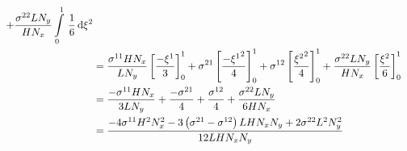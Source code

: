 \begin{equation}
\begin{aligned}
    +\dfrac{\conductivitytensorsymbol^{22} L N_{y}}{H N_{x}}\gint{0}{1}{\dfrac{1}{6}}{\xitwo} \\
    &=\dfrac{\conductivitytensorsymbol^{11} H N_{x}}{L N_{y}}\sqbrac{\dfrac{-\xione}{3}}^{1}_{0}
    +\conductivitytensorsymbol^{21}\sqbrac{\dfrac{-\xionesq}{4}}^{1}_{0}
    +\conductivitytensorsymbol^{12}\sqbrac{\dfrac{\xitwosq}{4}}^{1}_{0}
    +\dfrac{\conductivitytensorsymbol^{22} L N_{y}}{H N_{x}}\sqbrac{\dfrac{\xitwo}{6}}^{1}_{0} \\
    &=\dfrac{-\conductivitytensorsymbol^{11} H N_{x}}{3 L N_{y}}+\dfrac{-\conductivitytensorsymbol^{21}}{4}+
    \dfrac{\conductivitytensorsymbol^{12}}{4}+\dfrac{\conductivitytensorsymbol^{22} L N_{y}}{6 H N_{x}} \\
    &=\dfrac{-4\conductivitytensorsymbol^{11}H^{2}N_{x}^{2}-3\pbrac{\conductivitytensorsymbol^{21}-
        \conductivitytensorsymbol^{12}}L H N_{x} N_{y}+2\conductivitytensorsymbol^{22}L^{2}N_{y}^{2}}{12 L H N_{x} N_{y}}
  \end{aligned}
\end{equation}

